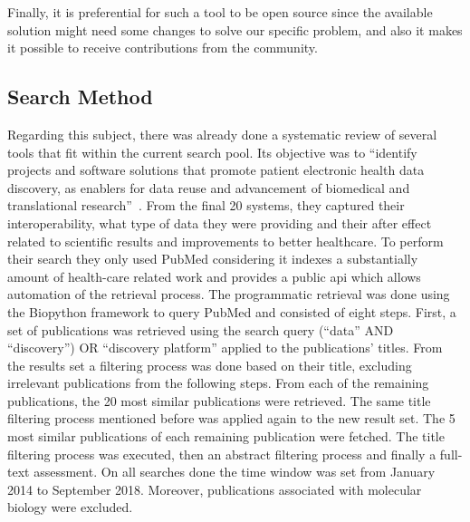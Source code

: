 Finally, it is preferential for such a tool to be open source since the available
solution might need some changes to solve our specific problem, and also it makes it
possible to receive contributions from the community.

\subsection*{Search Method}

Regarding this subject, there was already done a systematic review of several tools that fit within the current search pool.
Its objective was to ``identify projects and software solutions that promote patient electronic health data discovery, as enablers for data reuse and advancement of biomedical and translational research''~\cite{systematic-review}.
From the final 20 systems, they captured their interoperability, what type of data they were providing and their after effect related to scientific results and improvements to better healthcare.
To perform their search they only used PubMed  considering it indexes a substantially amount of health-care related work and provides a public \gls{api} which allows automation of the retrieval process.
The programmatic retrieval was done using the Biopython framework to query PubMed and consisted of eight steps.
First, a set of publications was retrieved using the search query (``data'' AND ``discovery'') OR ``discovery platform'' applied to the publications' titles.
From the results set a filtering process was done based on their title, excluding irrelevant publications from the following steps.
From each of the remaining publications, the 20 most similar publications were retrieved.
The same title filtering process mentioned before was applied again to the new result set.
The 5 most similar publications of each remaining publication were fetched.
The title filtering process was executed, then an abstract filtering process and finally a full-text assessment.
On all searches done the time window was set from January 2014 to September 2018.
Moreover, publications associated with molecular biology were excluded.

